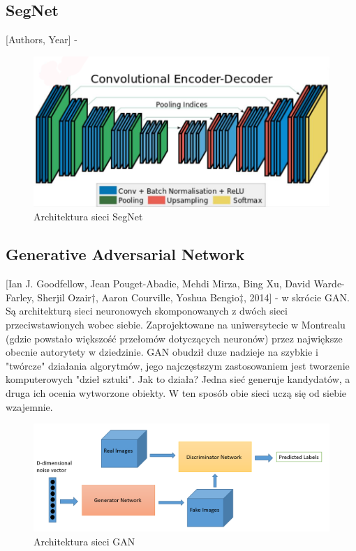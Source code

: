 \documentclass[a4paper,twoside,titlepage,openright]{book}
\begin{document}
\subsection{SegNet}
[Authors, Year] - 
\begin{figure}[h]
	\centering
			\includegraphics[resolution=120]{SegNet.png}
		\caption{Architektura sieci SegNet}
\end{figure}

\subsection{Generative Adversarial Network}
[Ian J. Goodfellow, Jean Pouget-Abadie, Mehdi Mirza, Bing Xu, David Warde-Farley, Sherjil Ozair†, Aaron Courville, Yoshua Bengio‡, 2014] - w skrócie GAN. Są architekturą sieci neuronowych skomponowanych z dwóch sieci przeciwstawionych wobec siebie. Zaprojektowane na uniwersytecie w Montrealu (gdzie powstało większość przełomów dotyczących neuronów) przez największe obecnie autorytety w dziedzinie. GAN obudził duze nadzieje na szybkie i "twórcze" działania algorytmów, jego najczęstszym zastosowaniem jest tworzenie komputerowych "dzieł sztuki". Jak to działa? Jedna sieć generuje kandydatów, a druga ich ocenia wytworzone obiekty. W ten sposób obie sieci uczą się od siebie wzajemnie. 
\begin{figure}[h]
	\centering
			\includegraphics[resolution=120]{GAN.png}
		\caption{Architektura sieci GAN}
\end{figure}
\end{document}
